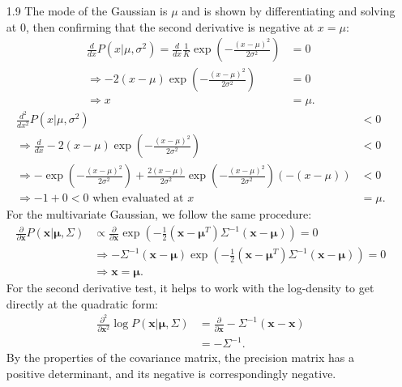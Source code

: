 \documentclass[]{article}
\begin{document}
\begin{enumerate}
 	\item[1.9] The mode of the Gaussian is $\mu$ and is shown by differentiating and solving at 0, then confirming that the second derivative is negative at $x = \mu$:
 	\begin{align*}
 	\frac{d}{dx} P(x | \mu, \sigma^2) = \frac{d}{dx} \frac{1}{K} \exp \left(-\frac{(x - \mu)^2}{2 \sigma^2}\right) &= 0 \\
 	\Rightarrow -2(x - \mu)\exp \left( -\frac{(x - \mu)^2}{2 \sigma^2} \right) &= 0 \\
 	\Rightarrow x &= \mu.
 	\end{align*}
 	\begin{align*}
 	\frac{d^2}{dx^2}P(x | \mu, \sigma^2) &< 0 \\
 	\Rightarrow \frac{d}{dx} -2(x - \mu)\exp \left( -\frac{(x - \mu)^2}{2 \sigma^2} \right) &< 0 \\
 	\Rightarrow - \exp\left( - \frac{(x - \mu)^2}{2 \sigma^2} \right) + \frac{2(x - \mu)}{2 \sigma^2} \exp\left( - \frac{(x - \mu)^2}{2 \sigma^2} \right)\left(- (x - \mu)\right) &< 0 \\
 	\Rightarrow -1 + 0 < 0 \text{ when evaluated at } x &= \mu.
 	\end{align*}
 	For the multivariate Gaussian, we follow the same procedure:
 	\begin{align*}
 	\frac{\partial}{\partial \mathbf{x}} P(\mathbf{x} | \boldsymbol{\mu}, \Sigma ) & \propto \frac{\partial}{\partial \mathbf{x}} \exp \left( - \frac{1}{2} (\mathbf{x} - \boldsymbol{\mu}^T)\Sigma^{-1} (\mathbf{x}-\boldsymbol{\mu}) \right) = 0 \\
 	& \Rightarrow - \Sigma^{-1}(\mathbf{x} - \boldsymbol{\mu}) \exp \left( - \frac{1}{2} (\mathbf{x} - \boldsymbol{\mu}^T)\Sigma^{-1} (\mathbf{x}-\boldsymbol{\mu}) \right) = 0 \tag{3} \\
 	& \Rightarrow \mathbf{x} = \boldsymbol{\mu}.
 	\end{align*}
 	For the second derivative test, it helps to work with the log-density to get directly at the quadratic form:
 	\begin{align*}
 	\frac{\partial^2}{\partial \boldsymbol{x}^2} \log P(\mathbf{x} | \boldsymbol{\mu}, \Sigma) & = \frac{\partial}{\partial \boldsymbol{x}}- \Sigma^{-1}(\boldsymbol{x} - \boldsymbol{x}) \\
 	& = -\Sigma^{-1}.
 	\end{align*}
 	By the properties of the covariance matrix, the precision matrix has a positive determinant, and its negative is correspondingly negative.
 	

\end{enumerate}
\end{document}
